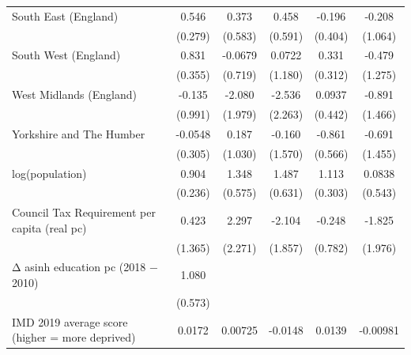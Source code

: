 \begin{table}[htbp]
\begin{tabular}{l*{5}{c}}
\addlinespace
South East (England)&       0.546\sym{*}  &       0.373         &       0.458         &      -0.196         &      -0.208         \\
                    &     (0.279)         &     (0.583)         &     (0.591)         &     (0.404)         &     (1.064)         \\
\addlinespace
South West (England)&       0.831\sym{**} &     -0.0679         &      0.0722         &       0.331         &      -0.479         \\
                    &     (0.355)         &     (0.719)         &     (1.180)         &     (0.312)         &     (1.275)         \\
\addlinespace
West Midlands (England)&      -0.135         &      -2.080         &      -2.536         &      0.0937         &      -0.891         \\
                    &     (0.991)         &     (1.979)         &     (2.263)         &     (0.442)         &     (1.466)         \\
\addlinespace
Yorkshire and The Humber&     -0.0548         &       0.187         &      -0.160         &      -0.861         &      -0.691         \\
                    &     (0.305)         &     (1.030)         &     (1.570)         &     (0.566)         &     (1.455)         \\
\addlinespace
log(population)     &       0.904\sym{***}&       1.348\sym{**} &       1.487\sym{**} &       1.113\sym{***}&      0.0838         \\
                    &     (0.236)         &     (0.575)         &     (0.631)         &     (0.303)         &     (0.543)         \\
\addlinespace
Council Tax Requirement per capita (real pc)&       0.423         &       2.297         &      -2.104         &      -0.248         &      -1.825         \\
                    &     (1.365)         &     (2.271)         &     (1.857)         &     (0.782)         &     (1.976)         \\
\addlinespace
Δ asinh education pc (2018 − 2010)&       1.080\sym{*}  &                     &                     &                     &                     \\
                    &     (0.573)         &                     &                     &                     &                     \\
\addlinespace
IMD 2019 average score (higher = more deprived)&      0.0172         &     0.00725         &     -0.0148         &      0.0139         &    -0.00981         \\

\end{tabular}
\end{table}
